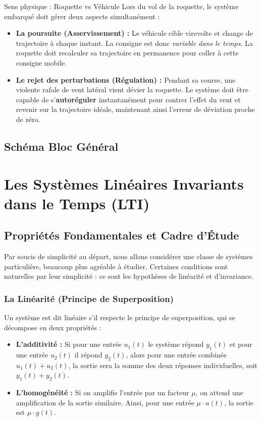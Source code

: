 \documentclass[11pt,a4paper]{report}
\begin{document}
\begin{importantbox}{Sens physique : Roquette vs Véhicule}
Lors du vol de la roquette, le système embarqué doit gérer deux aspects simultanément :
\begin{itemize}
    \item \textbf{La poursuite (Asservissement) :} Le véhicule cible virevolte et change de trajectoire à chaque instant. La consigne est donc \textit{variable dans le temps}. La roquette doit recalculer sa trajectoire en permanence pour coller à cette consigne mobile.
    \item \textbf{Le rejet des perturbations (Régulation) :} Pendant sa course, une violente rafale de vent latéral vient dévier la roquette. Le système doit être capable de s'\textbf{autoréguler} instantanément pour contrer l'effet du vent et revenir sur la trajectoire idéale, maintenant ainsi l'erreur de déviation proche de zéro.
\end{itemize}
\end{importantbox}

\section{Schéma Bloc Général}


\chapter{Les Systèmes Linéaires Invariants dans le Temps (LTI)}

\section{Propriétés Fondamentales et Cadre d'Étude}

Par soucis de simplicité au départ, nous allons considérer une classe de systèmes particulière, beaucoup plus agréable à étudier. Certaines conditions sont naturelles par leur simplicité : ce sont les hypothèses de linéarité et d'invariance.

\subsection{La Linéarité (Principe de Superposition)}
Un système est dit linéaire s'il respecte le principe de superposition, qui se décompose en deux propriétés :
\begin{itemize}
    \item \textbf{L'additivité :} Si pour une entrée $u_1(t)$ le système répond $y_1(t)$ et pour une entrée $u_2(t)$ il répond $y_2(t)$, alors pour une entrée combinée $u_1(t) + u_2(t)$, la sortie sera la somme des deux réponses individuelles, soit $y_1(t) + y_2(t)$.
    \item \textbf{L'homogénéité :} Si on amplifie l'entrée par un facteur $\mu$, on attend une amplification de la sortie similaire. Ainsi, pour une entrée $\mu \cdot u(t)$, la sortie est $\mu \cdot y(t)$.
\end{itemize}
\end{document}
